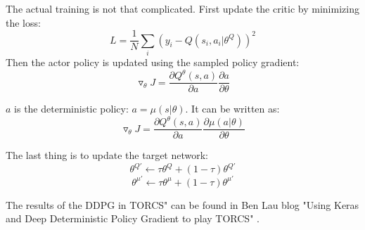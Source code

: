 The actual training is not that complicated. First update the critic by minimizing the loss:
\begin{equation}
L = \frac{1}{N} \sum_{i} (y_i - Q(s_i,a_i|\theta^Q))^2
\end{equation}
\newpage
Then the actor policy is updated using the sampled policy gradient:
\begin{equation}
\triangledown_\theta J = \frac{\partial Q^\theta(s,a)}{\partial a} \frac{\partial a }{\partial \theta}
\end{equation}

$a$ is the deterministic policy: $a=\mu(s|\theta)$. It can be written as:
\begin{equation}
\triangledown_\theta J = \frac{\partial Q^\theta(s,a)}{\partial a} \frac{\partial \mu(a|\theta) }{\partial \theta}
\end{equation}

The last thing is to update the target network:
\begin{equation}
\theta^{Q'} \leftarrow \tau \theta^Q + (1-\tau)\theta^{Q'} 
\end{equation}
\begin{equation}
\theta^{\mu'} \leftarrow \tau \theta^\mu + (1-\tau)\theta^{\mu'} 
\end{equation}

The results of the DDPG in TORCS" can be found in Ben Lau blog "Using Keras and Deep Deterministic Policy Gradient to play TORCS" \cite{DDPG_Torcs}.